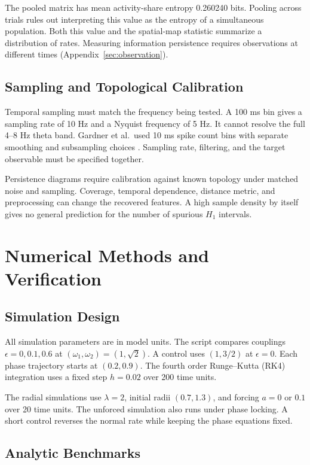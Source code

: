 \documentclass[12pt,a4paper]{article}
\begin{document}
The pooled matrix has mean activity-share entropy 0.260240 bits. Pooling across trials rules out interpreting this value as the entropy of a simultaneous population. Both this value and the spatial-map statistic summarize a distribution of rates. Measuring information persistence requires observations at different times (Appendix~\ref{sec:observation}).

\subsection{Sampling and Topological Calibration}

Temporal sampling must match the frequency being tested. A 100 ms bin gives a sampling rate of 10 Hz and a Nyquist frequency of 5 Hz. It cannot resolve the full 4--8 Hz theta band. Gardner et al.\ used 10 ms spike count bins with separate smoothing and subsampling choices \cite{Gardner2022}. Sampling rate, filtering, and the target observable must be specified together.

Persistence diagrams require calibration against known topology under matched noise and sampling. Coverage, temporal dependence, distance metric, and preprocessing can change the recovered features. A high sample density by itself gives no general prediction for the number of spurious $H_1$ intervals.

\section{Numerical Methods and Verification}\label{sec:simulation}

\subsection{Simulation Design}

All simulation parameters are in model units. The script  compares couplings $\epsilon=0,0.1,0.6$ at $(\omega_1,\omega_2)=(1,\sqrt{2})$. A control uses $(1,3/2)$ at $\epsilon=0$. Each phase trajectory starts at $(0.2,0.9)$. The fourth order Runge--Kutta (RK4) integration uses a fixed step $h=0.02$ over 200 time units.

The radial simulations use $\lambda=2$, initial radii $(0.7,1.3)$, and forcing $a=0$ or $0.1$ over 20 time units. The unforced simulation also runs under phase locking. A short control reverses the normal rate while keeping the phase equations fixed.

\subsection{Analytic Benchmarks}
\end{document}
